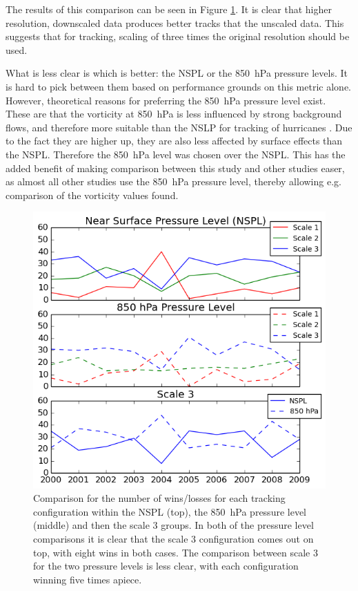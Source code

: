 \documentclass[pdftex,12pt,a4paper]{report}
\begin{document}
The results of this comparison can be seen in Figure \ref{fig:tracking_wins_losses}. It is clear
that higher resolution, downscaled data produces better tracks that the unscaled data. This suggests
that for tracking, scaling of three times the original resolution should be used.

What is less clear is which is better: the NSPL or the \SI{850}{hPa} pressure levels. It is hard to
pick between them based on performance grounds on this metric alone. However, theoretical reasons
for preferring the \SI{850}{hPa} pressure level exist. These are that the vorticity at \SI{850}{hPa}
is less influenced by strong background flows, and therefore more suitable than the NSLP for
tracking of hurricanes \parencite{trigo2006climatology}. Due to the fact they are higher up, they are
also less affected by surface effects than the NSPL. Therefore the \SI{850}{hPa} level was chosen
over the NSPL. This has the added benefit of making comparison between this study and other studies
easer, as almost all other studies use the \SI{850}{hPa} pressure level, thereby allowing e.g.
comparison of the vorticity values found.

\begin{figure}[hbp]
    \centering
    \includegraphics[width=\linewidth]{figures/tracking_wins_losses}
    \caption{Comparison for the number of wins/losses for each tracking configuration within the
        NSPL (top), the \SI{850}{hPa} pressure level (middle) and then the scale 3 groups. In both
        of the pressure level comparisons it is clear that the scale 3 configuration comes out on top,
        with eight wins in both cases. The comparison between scale 3 for the two pressure levels is less
        clear, with each configuration winning five times apiece.}
    \label{fig:tracking_wins_losses}
\end{figure}
\end{document}
